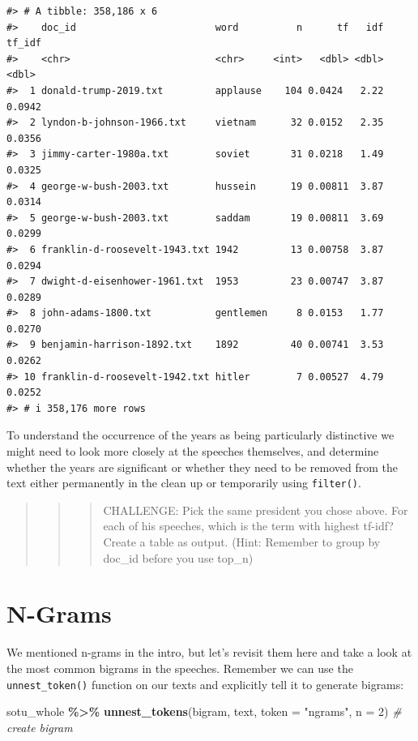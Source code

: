 \documentclass[
]{book}
\newenvironment{Shaded}{\begin{snugshade}}{\end{snugshade}}
\newcommand{\AttributeTok}[1]{\textcolor[rgb]{0.13,0.29,0.53}{#1}}
\newcommand{\CommentTok}[1]{\textcolor[rgb]{0.56,0.35,0.01}{\textit{#1}}}
\newcommand{\DecValTok}[1]{\textcolor[rgb]{0.00,0.00,0.81}{#1}}
\newcommand{\FunctionTok}[1]{\textcolor[rgb]{0.13,0.29,0.53}{\textbf{#1}}}
\newcommand{\NormalTok}[1]{#1}
\newcommand{\SpecialCharTok}[1]{\textcolor[rgb]{0.81,0.36,0.00}{\textbf{#1}}}
\newcommand{\StringTok}[1]{\textcolor[rgb]{0.31,0.60,0.02}{#1}}
\begin{document}
\begin{verbatim}
#> # A tibble: 358,186 x 6
#>    doc_id                        word          n      tf   idf tf_idf
#>    <chr>                         <chr>     <int>   <dbl> <dbl>  <dbl>
#>  1 donald-trump-2019.txt         applause    104 0.0424   2.22 0.0942
#>  2 lyndon-b-johnson-1966.txt     vietnam      32 0.0152   2.35 0.0356
#>  3 jimmy-carter-1980a.txt        soviet       31 0.0218   1.49 0.0325
#>  4 george-w-bush-2003.txt        hussein      19 0.00811  3.87 0.0314
#>  5 george-w-bush-2003.txt        saddam       19 0.00811  3.69 0.0299
#>  6 franklin-d-roosevelt-1943.txt 1942         13 0.00758  3.87 0.0294
#>  7 dwight-d-eisenhower-1961.txt  1953         23 0.00747  3.87 0.0289
#>  8 john-adams-1800.txt           gentlemen     8 0.0153   1.77 0.0270
#>  9 benjamin-harrison-1892.txt    1892         40 0.00741  3.53 0.0262
#> 10 franklin-d-roosevelt-1942.txt hitler        7 0.00527  4.79 0.0252
#> # i 358,176 more rows
\end{verbatim}

To understand the occurrence of the years as being particularly distinctive we might need to look more closely at the speeches themselves, and determine whether the years are significant or whether they need to be removed from the text either permanently in the clean up or temporarily using \texttt{filter()}.

\begin{quote}
\begin{quote}
\begin{quote}
CHALLENGE: Pick the same president you chose above. For each of his speeches, which is the term with highest tf-idf? Create a table as output. (Hint: Remember to group by doc\_id before you use top\_n)
\end{quote}
\end{quote}
\end{quote}

\section{N-Grams}\label{n-grams}

We mentioned n-grams in the intro, but let's revisit them here and take a look at the most common bigrams in the speeches. Remember we can use the \texttt{unnest\_token()} function on our texts and explicitly tell it to generate bigrams:

\begin{Shaded}
\begin{Highlighting}[]
\NormalTok{sotu\_whole }\SpecialCharTok{\%\textgreater{}\%}
  \FunctionTok{unnest\_tokens}\NormalTok{(bigram, text, }\AttributeTok{token =} \StringTok{"ngrams"}\NormalTok{, }\AttributeTok{n =} \DecValTok{2}\NormalTok{) }\CommentTok{\# create bigram}
\end{Highlighting}
\end{Shaded}
\end{document}
